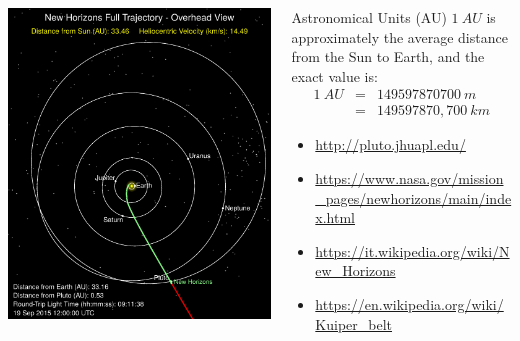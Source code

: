 \begin{frame}
  \immediate{}
  \immediate{}
  \begin{columns}[T]
    \begin{column}{0.65\textwidth}
      \includegraphics[width=\textwidth]{img/whereIs_NewHorizons.pdf}
    \end{column}
    \begin{column}{0.35\textwidth}
      \begin{block}{Astronomical Units (AU)}
        $1\ AU$ is approximately the average distance
        from the Sun to Earth, and the exact value is:
        \footnotesize
        \begin{eqnarray*}
        1\ AU &=& 149597870700\ m\\
        &=& 149597870,700\ km          
        \end{eqnarray*}
        \normalsize
      \end{block}
      \begin{itemize}
        \footnotesize
      \item \url{http://pluto.jhuapl.edu/}
      \item \url{https://www.nasa.gov/mission_pages/newhorizons/main/index.html}
      \item \url{https://it.wikipedia.org/wiki/New_Horizons}
      \item \url{https://en.wikipedia.org/wiki/Kuiper_belt}
      \end{itemize}
    \end{column}
  \end{columns}
\end{frame}

